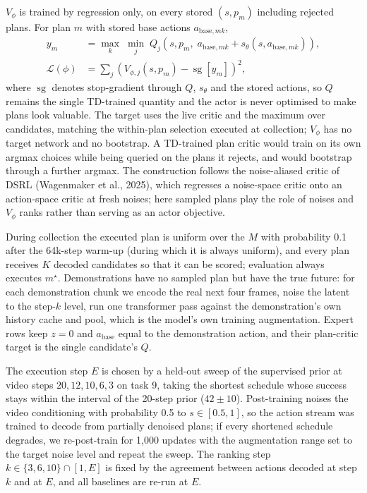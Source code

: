 \documentclass[10pt,twocolumn]{article}
\DeclareMathOperator{\sg}{sg}
\begin{document}
$V_\phi$ is trained by regression only, on every stored $(s, p_m)$ including rejected plans. For plan $m$ with stored base actions $a_{\mathrm{base},mk}$,
\begin{equation}
\begin{split}
y_m &= \max_{k} \; \min_{j} \; Q_j\!\left(s, p_m, \; a_{\mathrm{base},mk} + s_\theta(s, a_{\mathrm{base},mk})\right), \\
\mathcal{L}(\phi) &= \sum_{j} \left( V_{\phi,j}(s, p_m) - \sg[y_m] \right)^2,
\end{split}
\label{eq:plancritic}
\end{equation}
where $\sg$ denotes stop-gradient through $Q$, $s_\theta$ and the stored actions, so $Q$ remains the single TD-trained quantity and the actor is never optimised to make plans look valuable. The target uses the live critic and the maximum over candidates, matching the within-plan selection executed at collection; $V_\phi$ has no target network and no bootstrap. A TD-trained plan critic would train on its own argmax choices while being queried on the plans it rejects, and would bootstrap through a further argmax. The construction follows the noise-aliased critic of DSRL (Wagenmaker et al., 2025), which regresses a noise-space critic onto an action-space critic at fresh noises; here sampled plans play the role of noises and $V_\phi$ ranks rather than serving as an actor objective.

During collection the executed plan is uniform over the $M$ with probability 0.1 after the 64k-step warm-up (during which it is always uniform), and every plan receives $K$ decoded candidates so that it can be scored; evaluation always executes $m^\star$. Demonstrations have no sampled plan but have the true future: for each demonstration chunk we encode the real next four frames, noise the latent to the step-$k$ level, run one transformer pass against the demonstration's own history cache and pool, which is the model's own training augmentation. Expert rows keep $z = 0$ and $a_{\mathrm{base}}$ equal to the demonstration action, and their plan-critic target is the single candidate's $Q$.

The execution step $E$ is chosen by a held-out sweep of the supervised prior at video steps $20, 12, 10, 6, 3$ on task 9, taking the shortest schedule whose success stays within the interval of the 20-step prior ($42 \pm 10$). Post-training noises the video conditioning with probability 0.5 to $s \in [0.5, 1]$, so the action stream was trained to decode from partially denoised plans; if every shortened schedule degrades, we re-post-train for 1,000 updates with the augmentation range set to the target noise level and repeat the sweep. The ranking step $k \in \{3, 6, 10\} \cap [1, E]$ is fixed by the agreement between actions decoded at step $k$ and at $E$, and all baselines are re-run at $E$.
\end{document}
